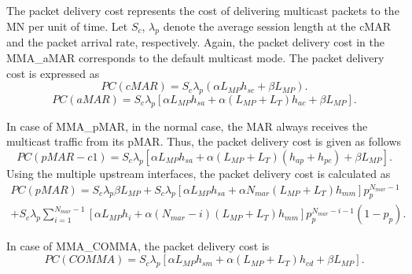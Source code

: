 The packet delivery cost represents the cost of delivering multicast packets to the MN per unit of time. Let $S_{c}$, $\lambda_{p}$ denote the average session length at the cMAR and the packet arrival rate, respectively. Again, the packet delivery cost in the MMA\_aMAR corresponds to the default multicast mode. The packet delivery cost is expressed as\\
\begin{equation}
PC(cMAR) = S_{c} \lambda_{p} (\alpha L_{MP} h_{sc}  + \beta L_{MP}).
\end{equation}
\begin{equation}
PC(aMAR) = S_{c} \lambda_{p} [\alpha L_{MP} h_{sa} + \alpha (L_{MP} + L_{T}) h_{ac}  + \beta L_{MP}].
\end{equation}

In case of MMA\_pMAR, in the normal case, the MAR always receives the multicast traffic from its pMAR. Thus, the packet delivery cost is given as follows \\
\begin{equation}
PC(pMAR-c1)=  S_{c} \lambda_{p} [\alpha  L_{MP} h_{sa} +  \alpha  (L_{MP} + L_{T}) ( h_{ap} + h_{pc}) + \beta L_{MP}].
\end{equation}
Using the multiple upstream interfaces, the packet delivery cost is calculated as
\begin{multline}
PC(pMAR)= S_{c} \lambda_{p}  \beta L_{MP} +  S_{c} \lambda_{p} [\alpha L_{MP} h_{sa}+ \alpha N_{mar}  (L_{MP} +L_{T}) h_{mm}] p_{p}^{N_{mar}-1} \\+ S_{c} \lambda_{p} \sum_{i=1}^{N_{mar}-1} [\alpha L_{MP} h_{i}+ \alpha  (N_{mar}-i) (L_{MP} +L_{T}) h_{mm}] p_{p}^{N_{mar}-i-1} (1-p_{p}).
\end{multline}

In case of MMA\_COMMA, the packet delivery cost is\\
\begin{equation}
PC(COMMA) = S_{c} \lambda_{p} [\alpha L_{MP} h_{sm} + \alpha (L_{MP} + L_{T}) h_{cd}  + \beta L_{MP}].
\end{equation}

